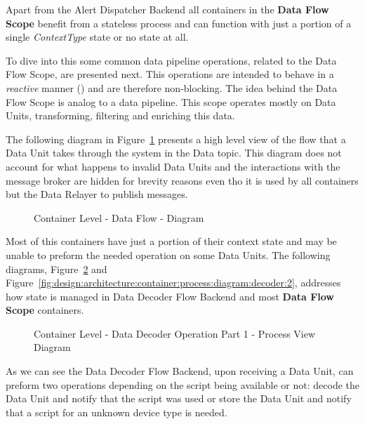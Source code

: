 Apart from the Alert Dispatcher Backend all containers in the \textbf{Data Flow Scope} benefit from a stateless process and can function with just a portion of a single \textit{ContextType} state or no state at all.

To dive into this some common data pipeline operations, related to the Data Flow Scope, are presented next. This operations are intended to behave in a \textit{reactive} manner (\cite{reactivemanifesto}) and are therefore non-blocking. The idea behind the Data Flow Scope is analog to a data pipeline. This scope operates mostly on Data Units, transforming, filtering and enriching this data.

The following diagram in Figure~\ref{fig:design:architecture:container:process:diagram:flow} presents a high level view of the flow that a Data Unit takes through the system in the Data topic. This diagram does not account for what happens to invalid Data Units and the interactions with the message broker are hidden for brevity reasons even tho it is used by all containers but the Data Relayer to publish messages.

\begin{figure}[H]
   \centering
   \resizebox{\columnwidth}{!}
   {      
      
   }
   \caption[Container Level - Data Flow - Diagram]{Container Level - Data Flow - Diagram}
   \label{fig:design:architecture:container:process:diagram:flow}
\end{figure}

Most of this containers have just a portion of their context state and may be unable to preform the needed operation on some Data Units. The following diagrams, Figure~\ref{fig:design:architecture:container:process:diagram:decoder:1} and Figure~\ref{fig:design:architecture:container:process:diagram:decoder:2}, addresses how state is managed in Data Decoder Flow Backend and most \textbf{Data Flow Scope} containers.

\begin{figure}[H]
   \centering
   \resizebox{\columnwidth}{!}
   {      
      
   }
   \caption[Container Level - Data Decoder Operation part 1 - Process View Diagram]{Container Level - Data Decoder Operation Part 1 - Process View Diagram}
   \label{fig:design:architecture:container:process:diagram:decoder:1}
\end{figure}

As we can see the Data Decoder Flow Backend, upon receiving a Data Unit, can preform two operations depending on the script being available or not: decode the Data Unit and notify that the script was used or store the Data Unit and notify that a script for an unknown device type is needed.

